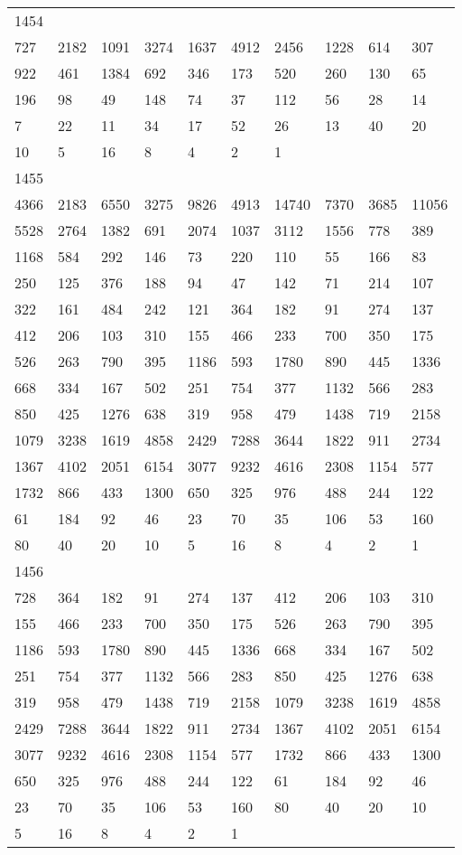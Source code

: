 \begin{longtable}{*{10}{l}}
1454&&&&&&&&&\\
727& 2182& 1091& 3274& 1637& 4912& 2456& 1228& 614& 307\\
922& 461& 1384& 692& 346& 173& 520& 260& 130& 65\\
196& 98& 49& 148& 74& 37& 112& 56& 28& 14\\
7& 22& 11& 34& 17& 52& 26& 13& 40& 20\\
10& 5& 16& 8& 4& 2& 1& \\

1455&&&&&&&&&\\
4366& 2183& 6550& 3275& 9826& 4913& 14740& 7370& 3685& 11056\\
5528& 2764& 1382& 691& 2074& 1037& 3112& 1556& 778& 389\\
1168& 584& 292& 146& 73& 220& 110& 55& 166& 83\\
250& 125& 376& 188& 94& 47& 142& 71& 214& 107\\
322& 161& 484& 242& 121& 364& 182& 91& 274& 137\\
412& 206& 103& 310& 155& 466& 233& 700& 350& 175\\
526& 263& 790& 395& 1186& 593& 1780& 890& 445& 1336\\
668& 334& 167& 502& 251& 754& 377& 1132& 566& 283\\
850& 425& 1276& 638& 319& 958& 479& 1438& 719& 2158\\
1079& 3238& 1619& 4858& 2429& 7288& 3644& 1822& 911& 2734\\
1367& 4102& 2051& 6154& 3077& 9232& 4616& 2308& 1154& 577\\
1732& 866& 433& 1300& 650& 325& 976& 488& 244& 122\\
61& 184& 92& 46& 23& 70& 35& 106& 53& 160\\
80& 40& 20& 10& 5& 16& 8& 4& 2& 1\\

1456&&&&&&&&&\\
728& 364& 182& 91& 274& 137& 412& 206& 103& 310\\
155& 466& 233& 700& 350& 175& 526& 263& 790& 395\\
1186& 593& 1780& 890& 445& 1336& 668& 334& 167& 502\\
251& 754& 377& 1132& 566& 283& 850& 425& 1276& 638\\
319& 958& 479& 1438& 719& 2158& 1079& 3238& 1619& 4858\\
2429& 7288& 3644& 1822& 911& 2734& 1367& 4102& 2051& 6154\\
3077& 9232& 4616& 2308& 1154& 577& 1732& 866& 433& 1300\\
650& 325& 976& 488& 244& 122& 61& 184& 92& 46\\
23& 70& 35& 106& 53& 160& 80& 40& 20& 10\\
5& 16& 8& 4& 2& 1& \\


\end{longtable}
